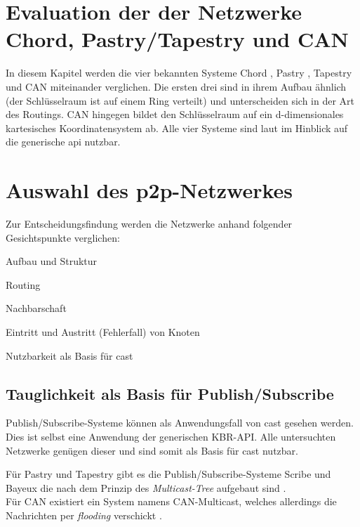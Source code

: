 \section[Evaluation dreier p2p-Netzwerke]{Evaluation der der Netzwerke Chord, Pastry/Tapestry und CAN}
In diesem Kapitel werden die vier bekannten Systeme Chord \cite{Stoica2003}, Pastry \cite{Rowstron2001}, Tapestry \cite{Zhao2001Tapestry,Zhao2004Tapestry} und CAN \cite{Ratnasamy2001Scalable} miteinander verglichen. Die ersten drei sind in ihrem Aufbau ähnlich (der Schlüsselraum ist auf einem Ring verteilt) und unterscheiden sich in der Art des Routings. CAN hingegen bildet den Schlüsselraum auf ein d-dimensionales kartesisches Koordinatensystem ab. Alle vier Systeme sind laut \cite{Dabek2003Towards} im Hinblick auf die generische \ac{api} nutzbar.





\section{Auswahl des p2p-Netzwerkes}

Zur Entscheidungsfindung werden die Netzwerke anhand folgender Gesichtspunkte verglichen:
\begin{itemize*}
\item Aufbau und Struktur
\item Routing
\item Nachbarschaft
\item Eintritt und Austritt (Fehlerfall) von Knoten
\item Nutzbarkeit als Basis für \ac{cast}
\end{itemize*}


\subsection*{Tauglichkeit als Basis für Publish/Subscribe}
Publish/Subscribe-Systeme können als Anwendungsfall von \ac{cast} gesehen werden. Dies ist selbst eine Anwendung der generischen KBR-API. Alle untersuchten Netzwerke genügen dieser und sind somit als Basis für \ac{cast} nutzbar.

Für Pastry und Tapestry gibt es die Publish/Subscribe-Systeme Scribe und Bayeux die nach dem Prinzip des \emph{Multicast-Tree} aufgebaut sind \cite{Castro2002Scribe, Zhuang2001}.\\
Für CAN existiert ein System namens CAN-Multicast, welches allerdings die Nachrichten per \emph{flooding} verschickt \cite{Ratnasamy2001}.

